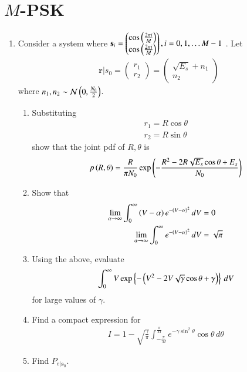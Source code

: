 \documentclass[journal,12pt,twocolumn]{IEEEtran}
\renewcommand\thesection{\arabic{section}}
\begin{document}
\section{$M$-PSK}
\begin{enumerate}[label=\thesection.\arabic*
,ref=\thesection.\theenumi]

\item
Consider a system where 
$\mathbf{s}_i=
\begin{pmatrix}
\cos\left(\frac{2\pi i}{M}\right)\\
\cos\left(\frac{2\pi i}{M}\right)
\end{pmatrix}, i = 0, 1 , \dots M-1
$
.
Let
%
\begin{align}
\mathbf{r}|s_0 = 
\begin{pmatrix}
r_1\\
r_2
\end{pmatrix}
=
\begin{pmatrix}
\sqrt{E_s}+n_1\\
n_2
\end{pmatrix}
\end{align}
where $n_1,n_2 \sim \mathcal{N}\left(0,\frac{N_0}{2}\right)$.

\begin{enumerate}
\item Substituting 
\begin{align}
r_1=R\cos \theta \\
r_2=R\sin \theta
\end{align}
show that the joint pdf of $R,\theta$ is
%
\begin{equation}
p\left(R,\theta\right)=\frac{R}{\pi N_0}\exp\left(-\frac{R^2-2R\sqrt{E_s}\cos \theta + E_s}{N_0}\right)
\end{equation}
%
\item Show that 
%
\begin{align}
\lim_{\alpha \rightarrow \infty}\int_{0}^{\infty}\left(V-\alpha \right)e^{-\left(V-\alpha\right)^2 }\,dV
&= 0
\\
\lim_{\alpha \rightarrow \infty}\int_{0}^{\infty} e^{-\left(V-\alpha\right)^2 }\,dV
&=  \sqrt{\pi}
\end{align}
%
\item 
Using the above, evaluate
%
\begin{align}
\int_{0}^{\infty}V\exp\left\{-\left(V^2 - 2V \sqrt{\gamma}\cos \theta +\gamma\right)\right\}\,dV
\end{align}
%
for large values of $\gamma$.
\item
Find a compact expression for 
%
\begin{align}
I = 1 - \sqrt{\frac{\gamma}{\pi}}\int_{-\frac{\pi}{M}}^{\frac{\pi}{M}}e^{- \gamma\sin^2\theta }\cos \theta\, d\theta
\end{align}
\item Find $P_{e|\mathbf{s}_0}$.
\end{enumerate}

%
\end{enumerate}
\end{document}

